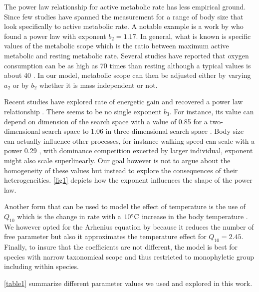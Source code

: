 The power law relationship for active metabolic rate has less empirical ground.
Since few studies have spanned the measurement for a range of body size that look specifically to active metabolic rate.
A notable example is a work by \citet{Bartholomew1978} who found a power law with exponent $b_2 = 1.17$.
In general, what is known is specific values of the metabolic scope which is the ratio between maximum active metabolic and resting metabolic rate.
Several studies have reported that oxygen consumption can be as high as 70 times than resting although a typical values is about 40 \citep{Bartholomew1981}.  
In our model, metabolic scope can then be adjusted either by varying $a_2$  or by $b_2$ whether it is mass independent or not. 

Recent studies have explored rate of energetic gain and recovered a power law relationship \citep{Maino2015, Pawar2012}.
There seems to be no single exponent $b_3$.
For instance, its value can depend on dimension of the search space with a value of 0.85 for a two-dimensional search space to 1.06 in three-dimensional search space \citep{Pawar2012}.
Body size can actually influence other processes, for instance walking speed  can scale with a power 0.29 \citep{Peters1986}, with dominance competition excerted by larger individual, exponent might also scale superlinearly.
Our goal however is not to argue about the homogeneity of these values but instead to explore the consequences of their heterogeneities. %
\cref{fig1} depicts how the exponent influences the shape of the power law.

Another form that can be used to model the effect of temperature is the use of $Q_{10}$ which is the change in rate with a $10^ {\circ} \rm{C}$ increase in the body temperature \citep{Precht1973}.
We however opted for the Arhenius equation by \citet{Brown2004} because it reduces the number of free parameter but also it approximates the temperature effect for $Q_{10} = 2.45$.  
Finally, to  insure that the coefficients are not different, the model is best for species with narrow taxonomical scope and thus restricted to monophyletic group including within species. 

\cref{table1} summarize different parameter values we used and explored in this work.

